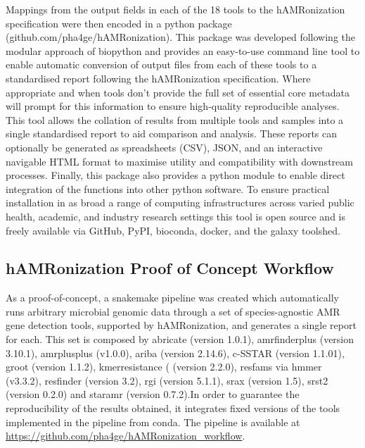 Mappings from the output fields in each of the 18 tools to the hAMRonization specification were then encoded in a python package (github.com/pha4ge/hAMRonization). This package was developed following the modular approach of biopython \cite{cock_biopython_2009} and provides an easy-to-use command line tool to enable automatic conversion of output files from each of these tools to a standardised report following the hAMRonization specification. Where appropriate and when tools don’t provide the full set of essential core metadata will prompt for this information to ensure high-quality reproducible analyses.  This tool allows the collation of results from multiple tools and samples into a single standardised report to aid comparison and analysis.  These reports can optionally be generated as spreadsheets (CSV), JSON, and an interactive navigable HTML format to maximise utility and compatibility with downstream processes. Finally, this package also provides a python module to enable direct integration of the functions into other python software. To ensure practical installation in as broad a range of computing infrastructures across varied public health, academic, and industry research settings this tool is open source and is freely available via GitHub, PyPI, bioconda, docker, and the galaxy toolshed.  

\subsection{hAMRonization Proof of Concept Workflow} \label{ch6_materials_workflow}

As a proof-of-concept, a  snakemake pipeline \cite{koster_snakemake--scalable_2012} was created which automatically runs arbitrary microbial genomic data through a set of species-agnostic AMR gene detection tools, supported by hAMRonization, and generates a single report for each. This set is composed by abricate (version 1.0.1), amrfinderplus \cite{feldgarden_validating_2019} (version 3.10.1), amrplusplus \cite{doster_megares_2020} (v1.0.0), ariba \cite{hunt_ariba_2017}(version 2.14.6), c-SSTAR \cite{de_man_sstar_2016} (version 1.1.01), groot \cite{rowe_indexed_2018} (version 1.1.2), kmerresistance \cite{clausen_benchmarking_2016}( (version 2.2.0), resfams \cite{gibson_improved_2015} via hmmer (v3.3.2), resfinder \cite{bortolaia_resfinder_2020} (version 3.2), rgi \cite{alcock_card_2020} (version 5.1.1), srax \cite{panunzi_srax_2020} (version 1.5), srst2 \cite{inouye_srst2_2014} (version 0.2.0) and staramr \cite{zankari_identification_2012} (version 0.7.2).In order to guarantee the reproducibility of the results obtained, it integrates fixed versions of the tools implemented in the pipeline from conda. The pipeline is available at  \url{https://github.com/pha4ge/hAMRonization_workflow}. 

